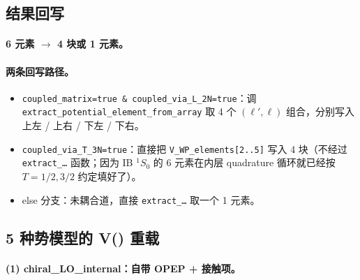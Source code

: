 \subsection{结果回写}
\label{subsec:ch08-writeback}

\paragraph{6 元素 \(\to\) 4 块或 1 元素。}


\paragraph{两条回写路径。}
\begin{itemize}
  \item \texttt{coupled\_matrix=true \& coupled\_via\_L\_2N=true}：调
        \texttt{extract\_potential\_element\_from\_array} 取 4 个 \((\ell', \ell)\)
        组合，分别写入上左 / 上右 / 下左 / 下右。
  \item \texttt{coupled\_via\_T\_3N=true}：直接把
        \texttt{V\_WP\_elements[2..5]} 写入 4 块（不经过
        \texttt{extract\_\ldots} 函数；因为 IB \({}^1S_0\) 的 6 元素在内层
        quadrature 循环就已经按 \(T = 1/2, 3/2\)
        约定填好了）。
  \item else 分支：未耦合道，直接 \texttt{extract\_\ldots} 取一个 1
        元素。
\end{itemize}

\subsection{5 种势模型的 V() 重载}
\label{subsec:ch08-five-pots}

\paragraph{(1) chiral\_LO\_internal：自带 OPEP + 接触项。}


